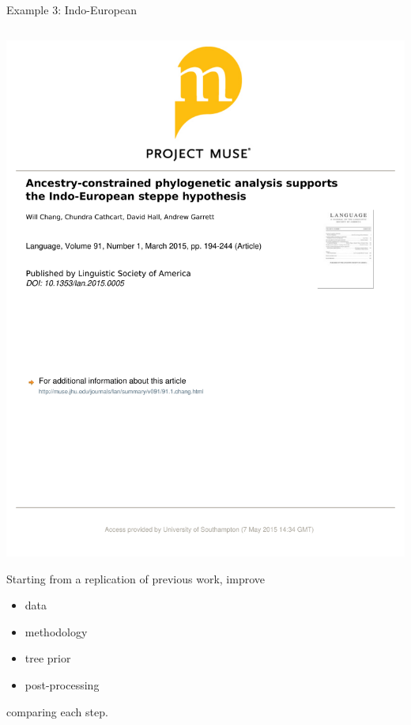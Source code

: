 \documentclass[9pt]{beamer}
\begin{document}
\begin{frame}{Example 3: Indo-European}
\begin{columns}
\begin{column}{0.5\textwidth}
      \includegraphics[width=\textwidth,page=31,trim={3.5cm 19.8cm 2.5cm 2.8cm},clip]{chang2015ancestry.pdf}
      
      Starting from a replication of previous work\footnotemark, improve
      \begin{itemize}
        \item data
        \item methodology
        \item tree prior
        \item post-processing
      \end{itemize}
      comparing each step.
    \end{column}
  \end{columns}
\end{frame}
\end{document}
